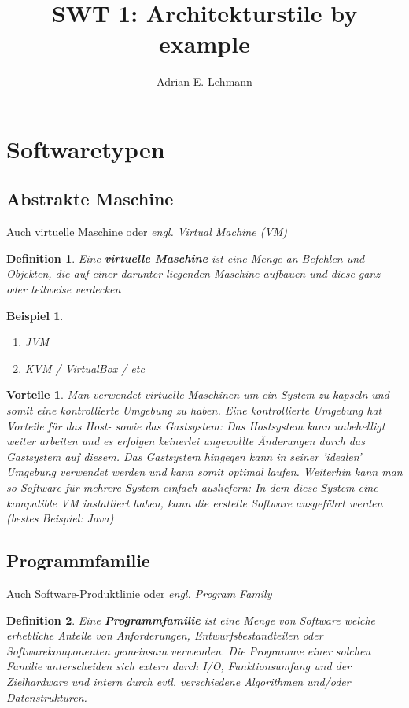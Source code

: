 \documentclass[a4paper]{article}
\title{SWT 1: Architekturstile by example}
\author{Adrian E. Lehmann}
\theoremstyle{break}
\newtheorem{defi}{Definition}[section]
\newtheorem{ex}{Beispiel}[section]
\newtheorem{why}{Vorteile}[section]
\begin{document}
	\maketitle
	\tableofcontents
	\newpage
	

\section{Softwaretypen}
\subsection{Abstrakte Maschine}
Auch virtuelle Maschine oder \textit{engl. Virtual Machine (VM)}
\begin{defi}
	Eine \textbf{virtuelle Maschine} ist eine Menge an Befehlen und Objekten, die auf einer darunter liegenden Maschine aufbauen und diese ganz oder teilweise verdecken
\end{defi}

\begin{ex}
\begin{enumerate}
	\item JVM
	\item KVM / VirtualBox / etc
\end{enumerate}
\end{ex}

\begin{why}
		Man verwendet virtuelle Maschinen um ein System zu kapseln und somit eine kontrollierte Umgebung zu haben. Eine kontrollierte Umgebung hat Vorteile für das Host- sowie das Gastsystem: Das Hostsystem kann unbehelligt weiter arbeiten und es erfolgen keinerlei ungewollte Änderungen durch das Gastsystem auf diesem. Das Gastsystem hingegen kann in seiner 'idealen' Umgebung verwendet werden und kann somit optimal laufen. Weiterhin kann man so Software für mehrere System einfach ausliefern: In dem diese System eine kompatible VM installiert haben, kann die erstelle Software ausgeführt werden (bestes Beispiel: Java)
\end{why}

\subsection{Programmfamilie}
Auch Software-Produktlinie oder \textit{engl. Program Family}
\begin{defi}
	Eine \textbf{Programmfamilie} ist eine Menge von Software welche erhebliche Anteile von Anforderungen, Entwurfsbestandteilen oder Softwarekomponenten gemeinsam verwenden.
	Die Programme einer solchen Familie unterscheiden sich extern durch I/O, Funktionsumfang und der Zielhardware und intern durch evtl. verschiedene Algorithmen und/oder Datenstrukturen.
\end{defi}
\end{document}
